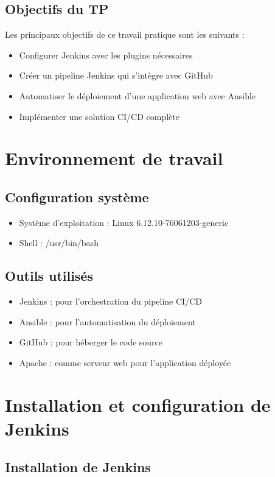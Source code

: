 \documentclass{article}
\begin{document}
\subsection{Objectifs du TP}
Les principaux objectifs de ce travail pratique sont les suivants :
\begin{itemize}
    \item Configurer Jenkins avec les plugins nécessaires
    \item Créer un pipeline Jenkins qui s'intègre avec GitHub
    \item Automatiser le déploiement d'une application web avec Ansible
    \item Implémenter une solution CI/CD complète
\end{itemize}

\section{Environnement de travail}
\subsection{Configuration système}
\begin{itemize}
    \item Système d'exploitation : Linux 6.12.10-76061203-generic
    \item Shell : /usr/bin/bash
\end{itemize}

\subsection{Outils utilisés}
\begin{itemize}
    \item Jenkins : pour l'orchestration du pipeline CI/CD
    \item Ansible : pour l'automatisation du déploiement
    \item GitHub : pour héberger le code source
    \item Apache : comme serveur web pour l'application déployée
\end{itemize}

\section{Installation et configuration de Jenkins}
\subsection{Installation de Jenkins}
\end{document}

